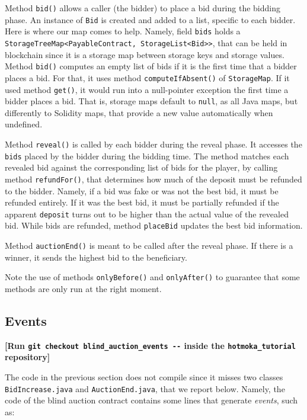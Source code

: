 \documentclass[a4paper,]{book}
\begin{document}
{Method \texttt{bid()} allows a caller (the bidder) to place a bid during
the bidding phase. An instance of \texttt{Bid} is created and added to a
list, specific to each bidder. Here is where our map comes to help.
Namely, field \texttt{bids} holds a
\texttt{StorageTreeMap\textless{}PayableContract,\ StorageList\textless{}Bid\textgreater{}\textgreater{}},
that can be held in blockchain since it is a storage map between storage
keys and storage values. Method \texttt{bid()} computes an empty list of
bids if it is the first time that a bidder places a bid. For that, it
uses method \texttt{computeIfAbsent()} of \texttt{StorageMap}. If it
used method \texttt{get()}, it would run into a null-pointer exception
the first time a bidder places a bid. That is, storage maps default to
\texttt{null}, as all Java maps, but differently to Solidity maps, that
provide a new value automatically when undefined.

Method \texttt{reveal()} is called by each bidder during the reveal
phase. It accesses the \texttt{bids} placed by the bidder during the
bidding time. The method matches each revealed bid against the
corresponding list of bids for the player, by calling method
\texttt{refundFor()}, that determines how much of the deposit must be
refunded to the bidder. Namely, if a bid was fake or was not the best
bid, it must be refunded entirely. If it was the best bid, it must be
partially refunded if the apparent \texttt{deposit} turns out to be
higher than the actual value of the revealed bid. While bids are
refunded, method \texttt{placeBid} updates the best bid information.

Method \texttt{auctionEnd()} is meant to be called after the reveal
phase. If there is a winner, it sends the highest bid to the
beneficiary.

Note the use of methods \texttt{onlyBefore()} and \texttt{onlyAfter()}
to guarantee that some methods are only run at the right moment.

\hypertarget{events}{%
\subsection{Events }\label{events}}

\textbf{{[}Run \texttt{git\ checkout\ blind\_auction\_events\ -\/-}
inside the \texttt{hotmoka\_tutorial} repository{]}}

The code in the previous section does not compile since it misses two
classes \texttt{BidIncrease.java} and \texttt{AuctionEnd.java}, that we
report below. Namely, the code of the blind auction contract contains
some lines that generate \emph{events}, such as:

}
\end{document}

